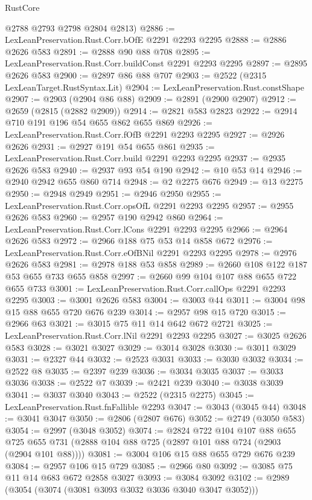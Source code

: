 \begin{lexlean}{RustCore}
\begin{coremodule}
      @2788
      @2793
      @2798
      @2804
      @2813)
@2886 := LexLeanPreservation.Rust.Corr.bOfE @2291 @2293 @2295
@2888 := @2886 @2626 @583
@2891 := @2888 @90 @88 @708
@2895 := LexLeanPreservation.Rust.Corr.buildConst @2291 @2293 @2295
@2897 := @2895 @2626 @583
@2900 := @2897 @86 @88 @707
@2903 := @2522 (@2315 LexLeanTarget.RustSyntax.Lit)
@2904 := LexLeanPreservation.Rust.constShape
@2907 := @2903 (@2904 @86 @88)
@2909 := @2891 (@2900 @2907)
@2912 := @2659 (@2815 (@2882 @2909))
@2914 := @2821 @583 @2823
@2922 := @2914 @710 @191 @196 @54 @655 @862 @655 @869
@2926 := LexLeanPreservation.Rust.Corr.fOfB @2291 @2293 @2295
@2927 := @2926 @2626
@2931 := @2927 @191 @54 @655 @861
@2935 := LexLeanPreservation.Rust.Corr.build @2291 @2293 @2295
@2937 := @2935 @2626 @583
@2940 := @2937 @93 @54 @190
@2942 := @10 @53 @14
@2946 := @2940 @2942 @655 @860 @714
@2948 := @2 @2275 @676
@2949 := @13 @2275
@2950 := @2948 @2949
@2951 := @2946 @2950
@2955 := LexLeanPreservation.Rust.Corr.opsOfL @2291 @2293 @2295
@2957 := @2955 @2626 @583
@2960 := @2957 @190 @2942 @860
@2964 := LexLeanPreservation.Rust.Corr.lCons @2291 @2293 @2295
@2966 := @2964 @2626 @583
@2972 := @2966 @188 @75 @53 @14 @858 @672
@2976 := LexLeanPreservation.Rust.Corr.eOfBNil @2291 @2293 @2295
@2978 := @2976 @2626 @583
@2981 := @2978 @188 @53 @858
@2989 := @2660 @108 @122 @187 @53 @655 @733 @655 @858
@2997 := @2660 @99 @104 @107 @88 @655 @722 @655 @733
@3001 := LexLeanPreservation.Rust.Corr.callOps @2291 @2293 @2295
@3003 := @3001 @2626 @583
@3004 := @3003 @44
@3011 := @3004 @98 @15 @88 @655 @720 @676 @239
@3014 := @2957 @98 @15 @720
@3015 := @2966 @63
@3021 := @3015 @75 @11 @14 @642 @672 @2721
@3025 := LexLeanPreservation.Rust.Corr.lNil @2291 @2293 @2295
@3027 := @3025 @2626 @583
@3028 := @3021 @3027
@3029 := @3014 @3028
@3030 := @3011 @3029
@3031 := @2327 @44
@3032 := @2523 @3031
@3033 := @3030 @3032
@3034 := @2522 @8
@3035 := @2397 @239
@3036 := @3034 @3035
@3037 := @3033 @3036
@3038 := @2522 @7
@3039 := @2421 @239
@3040 := @3038 @3039
@3041 := @3037 @3040
@3043 := @2522 (@2315 @2275)
@3045 := LexLeanPreservation.Rust.fnFallible @2293
@3047 := @3043 (@3045 @44)
@3048 := @3041 @3047
@3050 := @2806 (@2807 @676)
@3052 := @2749 (@3050 @583)
@3054 := @2997 (@3048 @3052)
@3074 := @2824
    @722
    @104
    @107
    @88
    @655
    @725
    @655
    @731
    (@2888 @104 @88 @725 (@2897 @101 @88 @724 (@2903 (@2904 @101 @88))))
@3081 := @3004 @106 @15 @88 @655 @729 @676 @239
@3084 := @2957 @106 @15 @729
@3085 := @2966 @80
@3092 := @3085 @75 @11 @14 @683 @672 @2858 @3027
@3093 := @3084 @3092
@3102 := @2989 (@3054 (@3074 (@3081 @3093 @3032 @3036 @3040 @3047 @3052)))

\end{coremodule}
\end{lexlean}
